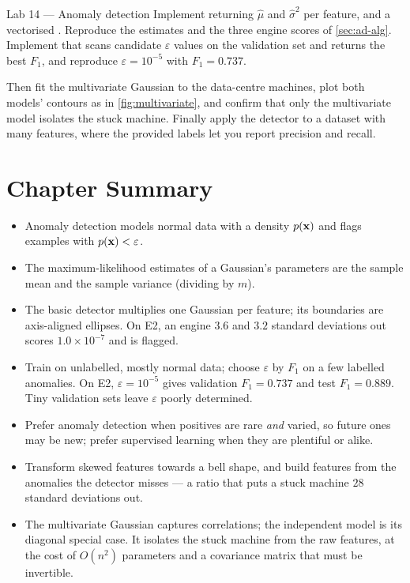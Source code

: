 \begin{labbox}{Lab 14 --- Anomaly detection}
Implement  returning $\hat\mu$ and $\hat\sigma^2$ per
feature, and a vectorised . Reproduce the estimates and the three
engine scores of \cref{sec:ad-alg}. Implement  that scans
candidate $\varepsilon$ values on the validation set and returns the best $F_1$,
and reproduce $\varepsilon = 10^{-5}$ with $F_1 = 0.737$.

Then fit the multivariate Gaussian to the data-centre machines, plot both models'
contours as in \cref{fig:multivariate}, and confirm that only the multivariate
model isolates the stuck machine. Finally apply the detector to a dataset with
many features, where the provided labels let you report precision and recall.
\end{labbox}

\section*{Chapter Summary}

\begin{itemize}
  \item Anomaly detection models normal data with a density $p(\mathbf{x})$ and flags
        examples with $p(\mathbf{x}) < \varepsilon$.
  \item The maximum-likelihood estimates of a Gaussian's parameters are the
        sample mean and the sample variance (dividing by $m$).
  \item The basic detector multiplies one Gaussian per feature; its boundaries are
        axis-aligned ellipses. On E2, an engine $3.6$ and $3.2$ standard
        deviations out scores $1.0\times10^{-7}$ and is flagged.
  \item Train on unlabelled, mostly normal data; choose $\varepsilon$ by $F_1$ on a
        few labelled anomalies. On E2, $\varepsilon = 10^{-5}$ gives validation
        $F_1 = 0.737$ and test $F_1 = 0.889$. Tiny validation sets leave
        $\varepsilon$ poorly determined.
  \item Prefer anomaly detection when positives are rare \emph{and} varied, so
        future ones may be new; prefer supervised learning when they are
        plentiful or alike.
  \item Transform skewed features towards a bell shape, and build features from
        the anomalies the detector misses --- a ratio that puts a stuck machine
        $28$ standard deviations out.
  \item The multivariate Gaussian captures correlations; the independent model is
        its diagonal special case. It isolates the stuck machine from the raw
        features, at the cost of $O(n^2)$ parameters and a covariance matrix that
        must be invertible.
\end{itemize}


